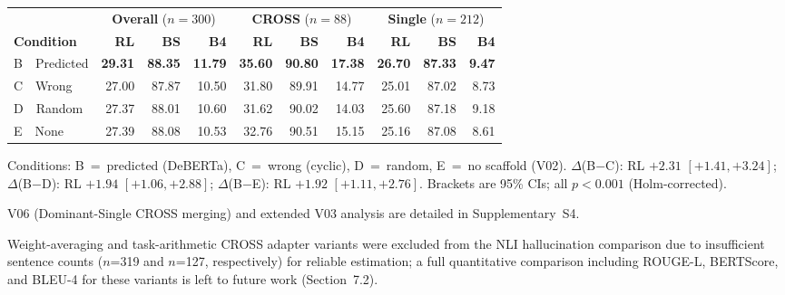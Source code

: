 \documentclass[a4paper,fleql]{cas-sc}
\begin{document}
\vspace{4pt}
\begin{center}
\begingroup
{}
\label{tab:funcaxis}
\setlength{\tabcolsep}{3.5pt}
\small
\begin{tabular}{lrrr|rrr|rrr}
\toprule
 & \multicolumn{3}{c|}{\textbf{Overall} ($n{=}300$)}
 & \multicolumn{3}{c|}{\textbf{CROSS} ($n{=}88$)}
 & \multicolumn{3}{c}{\textbf{Single} ($n{=}212$)} \\
\cmidrule(lr){2-4}\cmidrule(lr){5-7}\cmidrule(l){8-10}
\textbf{Condition} & \textbf{RL} & \textbf{BS} & \textbf{B4}
 & \textbf{RL} & \textbf{BS} & \textbf{B4}
 & \textbf{RL} & \textbf{BS} & \textbf{B4} \\
\midrule
B~~Predicted & \textbf{29.31} & \textbf{88.35} & \textbf{11.79}
 & \textbf{35.60} & \textbf{90.80} & \textbf{17.38}
 & \textbf{26.70} & \textbf{87.33} & \textbf{9.47} \\
C~~Wrong     & 27.00 & 87.87 & 10.50 & 31.80 & 89.91 & 14.77 & 25.01 & 87.02 & 8.73 \\
D~~Random    & 27.37 & 88.01 & 10.60 & 31.62 & 90.02 & 14.03 & 25.60 & 87.18 & 9.18 \\
E~~None      & 27.39 & 88.08 & 10.53 & 32.76 & 90.51 & 15.15 & 25.16 & 87.08 & 8.61 \\
\bottomrule
\end{tabular}

\vspace{3pt}
{\footnotesize\raggedright
Conditions: B~=~predicted (DeBERTa), C~=~wrong (cyclic), D~=~random,
E~=~no scaffold (V02).\quad
$\Delta$(B$-$C): RL $+2.31$ $[{+}1.41,{+}3.24]$;\quad
$\Delta$(B$-$D): RL $+1.94$ $[{+}1.06,{+}2.88]$;\quad
$\Delta$(B$-$E): RL $+1.92$ $[{+}1.11,{+}2.76]$.\quad
Brackets are 95\% CIs; all $p{<}0.001$ (Holm-corrected).\par}
\endgroup
\end{center}
\vspace{4pt}

V06 (Dominant-Single CROSS merging) and extended V03 analysis are detailed
in Supplementary~S4.

Weight-averaging and task-arithmetic CROSS adapter variants were excluded from the NLI hallucination comparison due to insufficient sentence counts ($n$=319 and $n$=127, respectively) for reliable estimation; a full quantitative comparison including ROUGE-L, BERTScore, and BLEU-4 for these variants is left to future work (Section~7.2).
\end{document}
